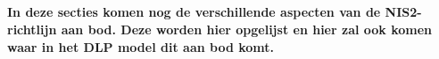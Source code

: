 \subsection {}
\label{sec:nis2_richtlijn}

\textbf{In deze secties komen nog de verschillende aspecten van de NIS2-richtlijn aan bod. Deze worden hier opgelijst en hier zal ook komen waar in het DLP model dit aan bod komt.}








